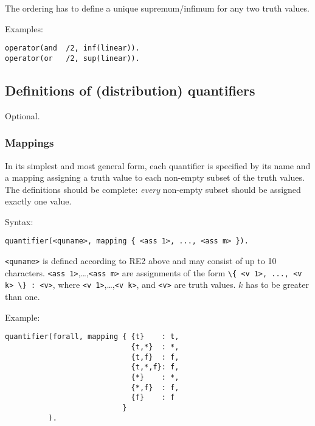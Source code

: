 \documentclass[
]{article}
\newcommand{\passthrough}[1]{#1}
\begin{document}
The ordering has to define a unique supremum/infimum for any two truth
values.

Examples:

\begin{lstlisting}
operator(and  /2, inf(linear)).
operator(or   /2, sup(linear)).
\end{lstlisting}

\hypertarget{definitions-of-distribution-quantifiers}{%
\subsection{Definitions of (distribution)
quantifiers}\label{definitions-of-distribution-quantifiers}}

Optional.

\hypertarget{mappings-1}{%
\subsubsection{Mappings}\label{mappings-1}}

In its simplest and most general form, each quantifier is specified by
its name and a mapping assigning a truth value to each non-empty subset
of the truth values. The definitions should be complete: \emph{every}
non-empty subset should be assigned exactly one value.

Syntax:

\begin{lstlisting}
quantifier(<quname>, mapping { <ass 1>, ..., <ass m> }).
\end{lstlisting}

\passthrough{\lstinline!<quname>!} is defined according to RE2 above and
may consist of up to 10 characters.
\passthrough{\lstinline!<ass 1>!},\ldots,\passthrough{\lstinline!<ass m>!}
are assignments of the form
\passthrough{\lstinline!\{ <v 1>, ..., <v k> \} : <v>!}, where
\passthrough{\lstinline!<v 1>!},\ldots,\passthrough{\lstinline!<v k>!},
and \passthrough{\lstinline!<v>!} are truth values. \(k\) has to be
greater than one.

Example:

\begin{lstlisting}
quantifier(forall, mapping { {t}    : t,
                             {t,*}  : *,
                             {t,f}  : f,
                             {t,*,f}: f,
                             {*}    : *,
                             {*,f}  : f,
                             {f}    : f
                           }
          ).
\end{lstlisting}
\end{document}

